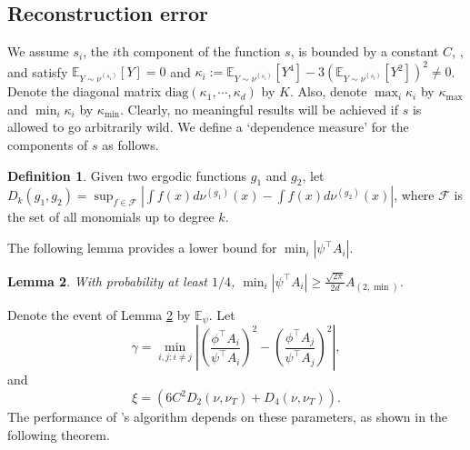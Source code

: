 \documentclass[twoside]{article}
\newcommand{\scom}[1]{s_{#1}}
\newcommand{\Epsi}{\mathbb{E}_{\psi}}
\newcommand{\E}{\mathbb{E}}
\newtheorem{lemma}{Lemma}[section]
\theoremstyle{definition}
\newtheorem{definition}[lemma]{Definition}
\begin{document}
\subsection{Reconstruction error}
\label{subsec:errorHK}
 We assume $s_i$, the $i$th component of the function $s$, is bounded by a constant $C$, , and satisfy $\E_{Y\sim\nu^{(\scom{i})}}[Y]=0$ and $\kappa_i := \E_{Y\sim \nu^{(\scom{i})}}[Y^4] - 3\left(\E_{Y\sim \nu^{(\scom{i})}}[Y^2]\right)^2\neq 0$.
Denote the diagonal matrix $\text{diag}(\kappa_1,\cdots,\kappa_d)$ by $K$. 
Also, denote $\max_{i} \kappa_i$ by $\kappa_{\max}$ and $\min_{i} \kappa_i$ by $\kappa_{\min}$.
Clearly, no meaningful results will be achieved if $s$ is allowed to go arbitrarily wild. 
We define a `dependence measure' for the components of $s$ as follows. 
\begin{definition}
Given two ergodic functions $g_1$ and $g_2$, let $D_k(g_1,g_2) = \sup_{f\in\mathcal{F}} |\int f(x)d\nu^{(g_1)}(x) - \int f(x)d\nu^{(g_2)}(x)|$, where $\mathcal{F}$ is the set of all monomials up to degree $k$.
\end{definition}  
The following lemma provides a lower bound for $\min_i |\psi^{\top}A_i|$.
\begin{lemma}
\label{lem:dmin}
With probability at least $1/4$, $\min_i |\psi^{\top}A_i| \ge \frac{\sqrt{2\pi}}{2d}A_{(2,\min)}$.  
\end{lemma}
Denote the event of Lemma \ref{lem:dmin} by $\Epsi$. Let 
\begin{equation}
\label{def:kappa}
\gamma =  \min_{i,j: i\neq j} \left\vert \left(\frac{\phi^{\top}A_i}{\psi^{\top}A_i}\right)^2 - \left(\frac{\phi^{\top}A_j}{\psi^{\top}A_j}\right)^2 \right\vert, 
\end{equation}
and 
\[
\xi = \left( 6C^2D_2(\nu, \nu_T) + D_4(\nu, \nu_T)\right).
\]
The performance of \citet{DHsu2012}'s algorithm depends on these parameters, as shown in the following theorem.
\end{document}
